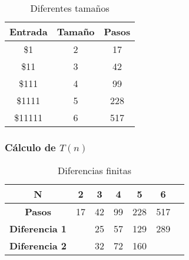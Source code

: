 \documentclass{uc3mpracticas}
\begin{document}
  \begin{table}[!h]
    \centering
  \begin{tabular}{|c|c|c|}
  \hline
  \textbf{Entrada} & \textbf{Tamaño} & \textbf{Pasos} \\ \hline
  \$1              & 2               & 17             \\ \hline
  \$11             & 3               & 42             \\ \hline
  \$111            & 4               & 99             \\ \hline
  \$1111           & 5               & 228            \\ \hline
  \$11111          & 6               & 517            \\ \hline
  \end{tabular}
  \caption{Diferentes tamaños}
  \end{table}



  \subsubsection{Cálculo de $T(n)$}

  \begin{table}[!h]
    \centering
  \begin{tabular}{|c|p{1cm}|p{1cm}|p{1cm}|p{1cm}|p{1cm}|p{1cm}|}
  \hline
  \textbf{N}     & \multicolumn{1}{c|}{\textbf{2}} & \multicolumn{1}{c|}{\textbf{3}} & \multicolumn{1}{c|}{\textbf{4}} & \multicolumn{1}{c|}{\textbf{5}} & \multicolumn{1}{c|}{\textbf{6}} \\ \hline
  \textbf{Pasos} & \multicolumn{1}{c|}{17}          & \multicolumn{1}{c|}{42}          & \multicolumn{1}{c|}{99}         & \multicolumn{1}{c|}{228}         & \multicolumn{1}{c|}{517} \\ \hline
  \textbf{Diferencia 1}                  &                                                         & 25                                                       & 57                               & 129                              & 289                             \\ \hline
  \textbf{Diferencia 2}                  &                                                         & \multicolumn{1}{r|}{32}                                  & \multicolumn{1}{r|}{72}          & \multicolumn{1}{r|}{160}       &                         \\ \hline
  \end{tabular}
  \caption{Diferencias finitas}
  \end{table}
\end{document}
